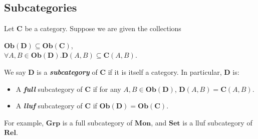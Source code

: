\documentclass[]{amsbook}
\newcommand{\catname}[1]{\mathbf{#1}}
\begin{document}
\subsection*{Subcategories}
Let $\catname{C}$ be a category. Suppose we are given the collections
\begin{center}
    $\mathbf{Ob}(\catname{D}) \subseteq \mathbf{Ob}(\catname{C})$,\\
    $\forall A, B \in \mathbf{Ob}(\catname{D}).
    \catname{D}(A, B) \subseteq \catname{C}(A, B)$.
\end{center}
We say $\catname{D}$ is a \emph{\textbf{subcategory}} of $\catname{C}$ if
it is itself a category. In particular, $\catname{D}$ is:
\begin{itemize}
    \item A \emph{\textbf{full}} subcategory of $\catname{C}$ if for any
    $A, B \in \mathbf{Ob}(\catname{D})$, $\catname{D}(A, B) = \catname{C}(A, B)$.
    \item  A \emph{\textbf{lluf}} subcategory of $\catname{C}$ if
    $\mathbf{Ob}(\catname{D}) = \mathbf{Ob}(\catname{C})$.
\end{itemize}
For example, $\catname{Grp}$ is a full subcategory of $\catname{Mon}$, and
$\catname{Set}$ is a lluf subcategory of $\catname{Rel}$.
\end{document}
